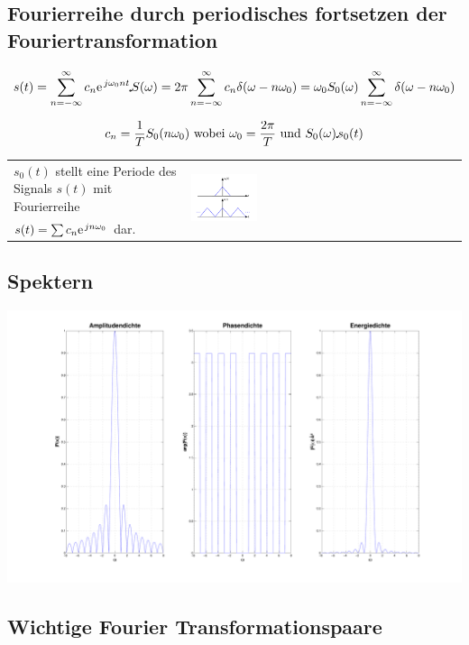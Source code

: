 \subsection{Fourierreihe durch periodisches fortsetzen der Fouriertransformation}
\[
s(t) = \sum\limits_{n=-\infty}^{\infty} c_n \e^{j\omega_0 n t} \FT S(\omega) = 2\pi \sum\limits_{n=-\infty}^{\infty}c_n \delta(\omega - n\omega_0)
= \omega_0 S_0(\omega) \sum\limits_{n=-\infty}^{\infty} \delta(\omega-n\omega_0)
\] 

\[
c_n = \frac{1}{T}S_0(n\omega_0) \text{ wobei } \omega_0 = \frac{2\pi}{T} \text{ und } S_0(\omega) \IFT s_0(t)
\]

\begin{tabular}{L{9cm}C{9cm}}
$s_0(t)$ stellt eine Periode des Signals $s(t)$ mit Fourierreihe
&  \\
$s(t) = \sum c_n \e^{jn\omega_0}$ dar. & \\
\end{tabular}

\vspace{1cm}

\subsection{Spektern}
\includegraphics[width=\textwidth,trim=1cm 1cm 1cm 1cm]{content/appendix/Spektern.pdf}


\subsection{Wichtige Fourier Transformationspaare}
  
	
